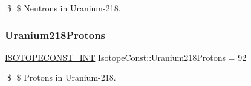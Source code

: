 \$ \$ Neutrons in Uranium-\/218. \mbox{\label{group___isotope_const-_uranium-_u218_ga6a969123a6e2d6ffa60d408ea2b864c7}} 
\subsubsection{\texorpdfstring{Uranium218\+Protons}{Uranium218Protons}}
{\footnotesize\ttfamily \mbox{\hyperlink{group___isotope_const-_macros_ga5f18360b3e99483a35c32d789e62621c}{I\+S\+O\+T\+O\+P\+E\+C\+O\+N\+S\+T\+\_\+\+I\+NT}} Isotope\+Const\+::\+Uranium218\+Protons = 92}

\$ \$ Protons in Uranium-\/218. 